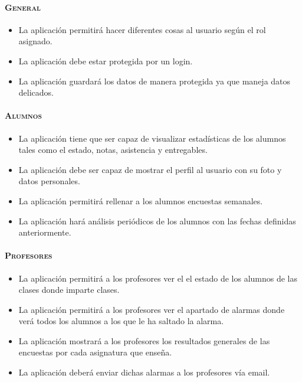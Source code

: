 \paragraph{\textsc {General}}
\begin{itemize}
\item {La aplicación permitirá hacer diferentes cosas al usuario según
  el rol asignado.}
\item {La aplicación debe estar protegida por un login.}
\item {La aplicación guardará los datos de manera protegida ya que
  maneja datos delicados.}
\end{itemize}
\paragraph{\textsc {Alumnos}}
\begin{itemize}
\item {La aplicación tiene que ser capaz de visualizar estadísticas de
  los alumnos tales como el estado, notas, asistencia y entregables.}
\item {La aplicación debe ser capaz de mostrar el perfil al usuario
  con su foto y datos personales.}
\item {La aplicación permitirá rellenar a los alumnos encuestas
  semanales.}
\item {La aplicación hará análisis periódicos de los alumnos con las
  fechas definidas anteriormente.}
\end{itemize}
\paragraph{\textsc {Profesores}}
\begin{itemize}
\item {La aplicación permitirá a los profesores ver el el estado de
  los alumnos de las clases donde imparte clases.}
\item {La aplicación permitirá a los profesores ver el apartado de
  alarmas donde verá todos los alumnos a los que le ha saltado la
  alarma.}
\item {La aplicación mostrará a los profesores los resultados
  generales de las encuestas por cada asignatura que enseña.}
\item {La aplicación deberá enviar dichas alarmas a los profesores vía
  email.}
\end{itemize}
